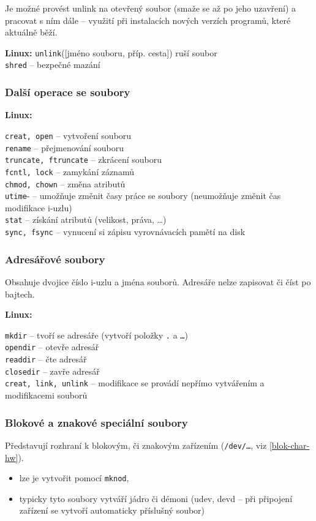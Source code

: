 \documentclass[a4paper, 11pt]{article}
\newcommand{\tcmd}[1]{\texttt{#1}}
\newcommand{\lpath}[1]{\texttt{#1}}
\begin{document}
Je možné provést unlink na otevřený soubor (smaže se až po jeho uzavření) a pracovat s ním dále -- využití při instalacích nových verzích programů, které aktuálně běží.
 
\textbf{Linux:}
\tcmd{unlink}([jméno souboru, příp. cesta]) ruší soubor \\[0.2em]
\tcmd{shred} -- bezpečné mazání

\subsubsection{Další operace se soubory}

\textbf{Linux:}

\tcmd{creat, open} -- vytvoření souboru \\[0.2em]
\tcmd{rename} -- přejmenování souboru \\[0.2em]
\tcmd{truncate, ftruncate} -- zkrácení souboru \\[0.2em]
\tcmd{fcntl, lock} -- zamykání záznamů \\[0.2em]
\tcmd{chmod, chown} -- změna atributů \\[0.2em]
\tcmd{utime}- -- umožňuje změnit časy práce se soubory (neumožňuje změnit čas modifikace i-uzlu) \\[0.2em]
\tcmd{stat} -- získání atributů (velikost, práva, \ldots) \\[0.2em]
\tcmd{sync, fsync} -- vynucení si zápisu vyrovnávacích pamětí na disk

\subsubsection{Adresářové soubory}
Obsahuje dvojice číslo i-uzlu a jména souborů. Adresáře nelze zapisovat či číst po bajtech.

\textbf{Linux:}

\tcmd{mkdir} -- tvoří se adresáře (vytvoří položky \lpath{.} a \lpath{\ldots}) \\[0.2em]
\tcmd{opendir} -- otevře adresář \\[0.2em]
\tcmd{readdir} -- čte adresář \\[0.2em]
\tcmd{closedir} -- zavře adresář \\[0.2em]
\tcmd{creat, link, unlink} -- modifikace se provádí nepřímo vytvářením a modifikacemi souborů

\subsubsection{Blokové a znakové speciální soubory}
Představují rozhraní k blokovým, či znakovým zařízením (\lpath{/dev/\ldots}, viz \ref{blok-char-hw}).
\begin{itemize}
\item lze je vytvořit pomocí \tcmd{mknod},
\item typicky tyto soubory vytváří jádro či démoni (udev, devd -- při připojení zařízení se vytvoří automaticky příslušný soubor)
\end{itemize}
\end{document}
